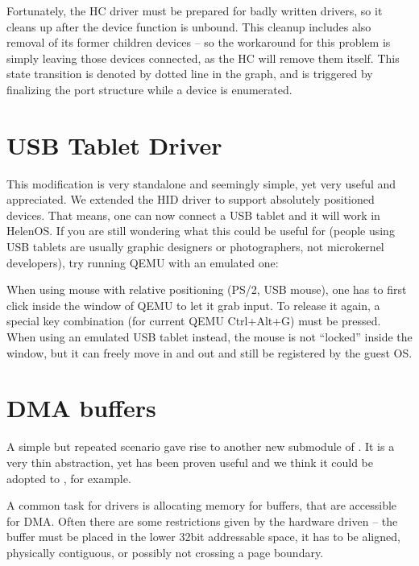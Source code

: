 Fortunately, the HC driver must be prepared for badly written drivers, so it
cleans up after the device function is unbound. This cleanup includes also
removal of its former children devices -- so the workaround for this problem is
simply leaving those devices connected, as the HC will remove them itself. This
state transition is denoted by dotted line in the graph, and is triggered by
finalizing the port structure while a device is enumerated.

\section{USB Tablet Driver}

This modification is very standalone and seemingly simple, yet very useful and
appreciated. We extended the HID driver to support absolutely positioned
devices. That means, one can now connect a USB tablet and it will work in
HelenOS. If you are still wondering what this could be useful for (people using
USB tablets are usually graphic designers or photographers, not microkernel
developers), try running QEMU with an emulated one:


When using mouse with relative positioning (PS/2, USB mouse), one has to first
click inside the window of QEMU to let it grab input. To release it again,
a special key combination (for current QEMU Ctrl+Alt+G) must be pressed. When
using an emulated USB tablet instead, the mouse is not ``locked'' inside the
window, but it can freely move in and out and still be registered by the guest
OS.

\section{DMA buffers}

A simple but repeated scenario gave rise to another new submodule of
. It is a very thin abstraction, yet has been proven useful and we
think it could be adopted to , for example.

A common task for drivers is allocating memory for buffers, that are accessible
for DMA. Often there are some restrictions given by the hardware driven -- the
buffer must be placed in the lower 32bit addressable space, it has to be
aligned, physically contiguous, or possibly not crossing a page boundary.

